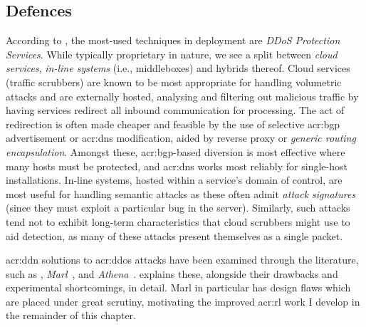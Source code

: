\subsection{Defences}
According to \textcite{DBLP:conf/imc/JonkerKKRSD17}, the most-used techniques in deployment are \emph{DDoS Protection Services}.
While typically proprietary in nature, we see a split between \emph{cloud services}, \emph{in-line systems} (i.e., middleboxes) and hybrids thereof.
Cloud services (traffic scrubbers) are known to be most appropriate for handling volumetric attacks and are externally hosted, analysing and filtering out malicious traffic by having services redirect all inbound communication for processing.
The act of redirection is often made cheaper and feasible by the use of selective \gls{acr:bgp} advertisement or \gls{acr:dns} modification, aided by reverse proxy or \emph{generic routing encapsulation}.
Amongst these, \gls{acr:bgp}-based diversion is most effective where many hosts must be protected, and \gls{acr:dns} works most reliably for single-host installations.
In-line systems, hosted within a service's domain of control, are most useful for handling semantic attacks as these often admit \emph{attack signatures} (since they must exploit a particular bug in the server).
Similarly, such attacks tend not to exhibit long-term characteristics that cloud scrubbers might use to aid detection, as many of these attacks present themselves as a single packet.

\gls{acr:ddn} solutions to \gls{acr:ddos} attacks have been examined through the literature, such as \Textcite{DBLP:conf/lcn/BragaMP10}, \emph{Marl}~\parencite{DBLP:conf/iaai/MalialisK13,DBLP:journals/eaai/MalialisK15}, and \emph{Athena}~\parencite{DBLP:conf/dsn/LeeKSPY17}.
 explains these, alongside their drawbacks and experimental shortcomings, in detail.
Marl in particular has design flaws which are placed under great scrutiny, motivating the improved \gls{acr:rl} work I develop in the remainder of this chapter.

